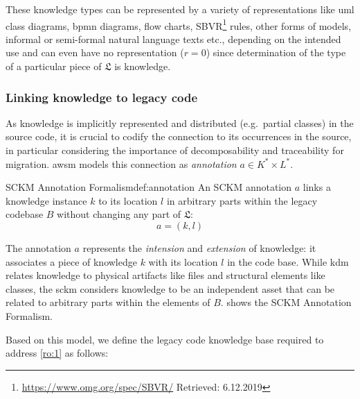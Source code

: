 These knowledge types can be represented by a variety of representations like \gls{uml} class diagrams, \gls{bpmn} diagrams, flow charts, SBVR\footnote{\url{https://www.omg.org/spec/SBVR/} Retrieved: 6.12.2019} rules, other forms of models, informal or semi-formal natural language texts etc., depending on the intended use and can even have no representation (\(r=0\)) since determination of the type of a particular piece of \(\mathfrak{L}\) is knowledge.

\vspace{-15pt}
\subsubsection*{Linking knowledge to legacy code} As knowledge is implicitly represented and distributed (e.g.~partial classes) in the source code, it is crucial to codify the connection to its occurrences in the source, in particular considering the importance of decomposability and traceability for migration.
\gls{awsm} models this connection as \emph{annotation} \(a \in K^* \times L^*\).

\vspace{-15pt}
\begin{thesisdefinition}{SCKM Annotation Formalism}{def:annotation}
An SCKM annotation \(a\) links a knowledge instance \(k\) to its location \(l\) in arbitrary parts within the legacy codebase \(B\) without changing any part of \(\mathfrak{L}\):
\begin{equation}a = (k, l)\label{eq:annotation}\end{equation}
\end{thesisdefinition}
\vspace{-5pt}

The annotation \(a\) represents the \emph{intension} and \emph{extension} \autocite{Chen2010FeatureLocation} of knowledge: it associates a piece of knowledge \(k\) with its location \(l\) in the  code base.
While \gls{kdm} relates knowledge to physical \glspl{artifact} like files and structural elements like classes, the \gls{sckm} considers knowledge to be an independent \gls{asset} that can be related to arbitrary parts within the elements of \(B\).
 shows the SCKM Annotation Formalism.

%
Based on this model, we define the legacy code knowledge base required to address \cref{ro:1} as follows:

